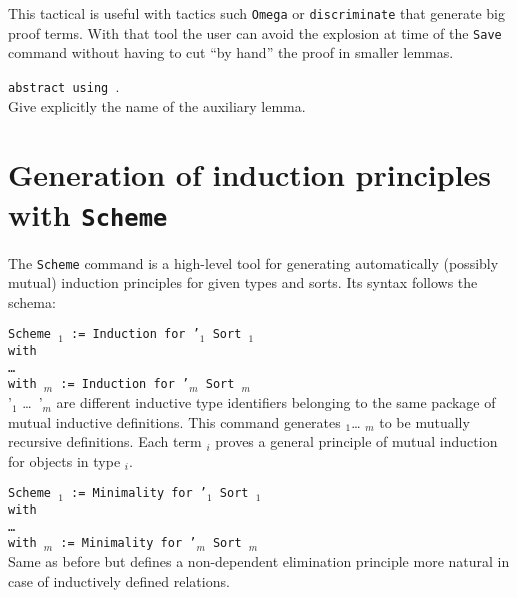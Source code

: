 This tactical is useful with tactics such \texttt{Omega} or
\texttt{discriminate} that generate big proof terms. With that tool
the user can avoid the explosion at time of the \texttt{Save} command
without having to cut ``by hand'' the proof in smaller lemmas.

\begin{Variants}
\item \texttt{abstract {\tac} using {\ident}}.\\
  Give explicitly the name of the auxiliary lemma.
\end{Variants}

\section{Generation of induction principles with {\tt Scheme}}
\label{Scheme}

The {\tt Scheme} command is a high-level tool for generating
automatically (possibly mutual) induction principles for given types
and sorts.  Its syntax follows the schema:

\noindent
{\tt Scheme {\ident$_1$} := Induction for \ident'$_1$ Sort {\sort$_1$} \\
  with\\
  \mbox{}\hspace{0.1cm} \dots\ \\
        with {\ident$_m$} := Induction for {\ident'$_m$} Sort
        {\sort$_m$}}\\

\ident'$_1$ \dots\ \ident'$_m$ are different inductive type
identifiers belonging to
the same package of mutual inductive definitions. This command
generates {\ident$_1$}\dots{} {\ident$_m$} to be mutually recursive
definitions. Each term {\ident$_i$} proves a general principle 
of mutual induction for objects in type {\term$_i$}. 


\begin{Variants}
\item {\tt Scheme {\ident$_1$} := Minimality for \ident'$_1$ Sort {\sort$_1$} \\
    with\\
    \mbox{}\hspace{0.1cm} \dots\ \\
    with {\ident$_m$} := Minimality for {\ident'$_m$} Sort
    {\sort$_m$}}\\
  Same as before but defines a non-dependent elimination principle more
  natural in case of inductively defined relations. 
\end{Variants}

